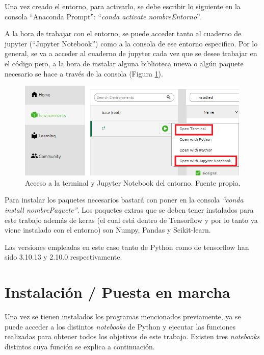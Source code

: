     Una vez creado el entorno, para activarlo, se debe escribir lo siguiente en la consola ``Anaconda Prompt'': ``\textit{conda activate nombreEntorno}''.
    
    A la hora de trabajar con el entorno, se puede acceder tanto al cuaderno de jupyter (``Jupyter Notebook'') como a la consola de ese entorno especifico. Por lo general, se va a acceder al cuaderno de jupyter cada vez que se desee trabajar en el código pero, a la hora de instalar alguna biblioteca nueva o algún paquete necesario se hace a través de la consola (Figura \ref{fig:acceso_entorno}).
    
    \begin{figure}[h]
        \centering
        \includegraphics[width=0.99\textwidth]{img/acceso_entorno.png}
        \caption{Acceso a la terminal y Jupyter Notebook del entorno. Fuente propia.}
        \label{fig:acceso_entorno}
    \end{figure}
   \FloatBarrier

    Para instalar los paquetes necesarios bastará con poner en la consola \textit{``conda install nombrePaquete''}. Los paquetes extras que se deben tener instalados para este trabajo además de keras (el cual está dentro de Tensorflow y por lo tanto ya viene instalado con el entorno) son Numpy, Pandas y  Scikit-learn.
    
    Las versiones empleadas en este caso tanto de Python como de tensorflow han sido 3.10.13 y 2.10.0 respectivamente.
    

\section{Instalación / Puesta en marcha}

Una vez se tienen instalados los programas mencionados previamente, ya se puede acceder a los distintos \textit{notebooks} de Python y ejecutar las funciones realizadas para obtener todos los objetivos de este trabajo. Existen tres \textit{notebooks} distintos cuya función se explica a continuación.


